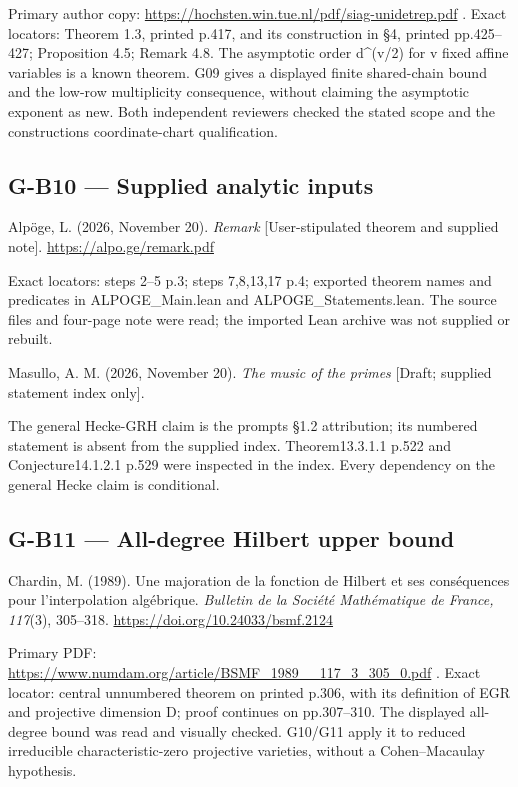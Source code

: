 \documentclass[11pt,a4paper]{article}
\theoremstyle{definition}\newtheorem{definition}{Definition}
\begin{document}
Primary author copy:
\url{https://hochsten.win.tue.nl/pdf/siag-unidetrep.pdf} . Exact
locators: Theorem 1.3, printed p.417, and its construction in §4,
printed pp.425--427; Proposition 4.5; Remark 4.8. The asymptotic order
d\^{}(v/2) for v fixed affine variables is a known theorem. G09 gives a
displayed finite shared-chain bound and the low-row multiplicity
consequence, without claiming the asymptotic exponent as new. Both
independent reviewers checked the stated scope and the
construction\textquotesingle s coordinate-chart qualification.

\subsection{G-B10 --- Supplied analytic
inputs}\label{g-b10--supplied-analytic-inputs}

Alpöge, L. (2026, November 20). \emph{Remark} {[}User-stipulated theorem
and supplied note{]}. \url{https://alpo.ge/remark.pdf}

Exact locators: steps 2--5 p.3; steps 7,8,13,17 p.4; exported theorem
names and predicates in ALPOGE\_Main.lean and ALPOGE\_Statements.lean.
The source files and four-page note were read; the imported Lean archive
was not supplied or rebuilt.

Masullo, A. M. (2026, November 20). \emph{The music of the primes}
{[}Draft; supplied statement index only{]}.

The general Hecke-GRH claim is the prompt\textquotesingle s §1.2
attribution; its numbered statement is absent from the supplied index.
Theorem13.3.1.1 p.522 and Conjecture14.1.2.1 p.529 were inspected in the
index. Every dependency on the general Hecke claim is conditional.

\subsection{G-B11 --- All-degree Hilbert upper
bound}\label{g-b11--all-degree-hilbert-upper-bound}

Chardin, M. (1989). Une majoration de la fonction de Hilbert et ses
conséquences pour l'interpolation algébrique. \emph{Bulletin de la
Société Mathématique de France, 117}(3), 305--318.
\url{https://doi.org/10.24033/bsmf.2124}

Primary PDF:
\url{https://www.numdam.org/article/BSMF_1989__117_3_305_0.pdf} . Exact
locator: central unnumbered theorem on printed p.306, with its
definition of EGR and projective dimension D; proof continues on
pp.307--310. The displayed all-degree bound was read and visually
checked. G10/G11 apply it to reduced irreducible characteristic-zero
projective varieties, without a Cohen--Macaulay hypothesis.
\end{document}
